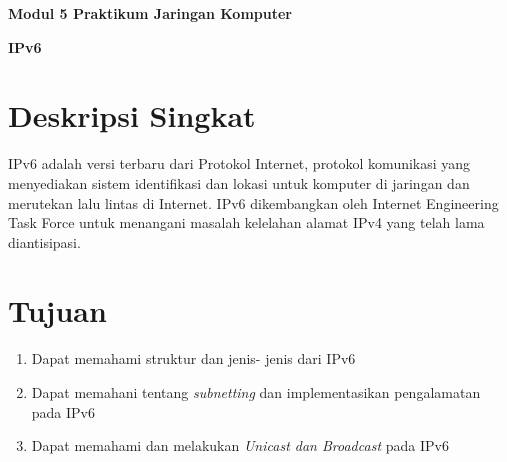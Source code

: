\documentclass{article}
\begin{document}
    \begin{center}
        \textbf{Modul 5 Praktikum Jaringan Komputer}

        \textbf{IPv6}
    \end{center}

    \section*{Deskripsi Singkat}
    IPv6 adalah versi terbaru dari Protokol Internet, protokol komunikasi yang menyediakan sistem identifikasi dan lokasi untuk komputer di jaringan dan merutekan lalu lintas di Internet. IPv6 dikembangkan oleh Internet Engineering Task Force untuk menangani masalah kelelahan alamat IPv4 yang telah lama diantisipasi. 
    \section*{Tujuan}
    \begin{enumerate}
        \item Dapat memahami struktur dan jenis- jenis dari IPv6
        \item Dapat memahani tentang \textit{subnetting} dan implementasikan pengalamatan pada IPv6
        \item Dapat memahami dan melakukan \textit{Unicast dan Broadcast} pada IPv6
    \end{enumerate}
\end{document}
